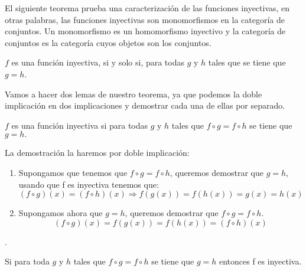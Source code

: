 %
\begin{isabellebody}%
%
%
\isadelimtheory
%
\endisadelimtheory
%
\isatagtheory
%
\endisatagtheory
{\isafoldtheory}%
%
\isadelimtheory
%
\endisadelimtheory
%
\isadelimdocument
%
\endisadelimdocument
%
\isatagdocument
%
\isamarkuptrue%
%
\endisatagdocument
{\isafolddocument}%
%
\isadelimdocument
%
\endisadelimdocument
%
\begin{isamarkuptext}%
El siguiente teorema prueba una caracterización de las funciones
 inyectivas, en otras palabras, las funciones inyectivas son
 monomorfismos en la categoría de conjuntos. Un monomorfismo es un
 homomorfismo inyectivo y la categoría de conjuntos es la categoría
 cuyos objetos son los conjuntos.
  
  \begin{teorema}
    $f$ es una función inyectiva, si y solo si, para todas $g$ y $h$
    tales que  se tiene que $g = h$. 
  \end{teorema}

Vamos a hacer dos lemas de nuestro teorema, ya que podemos la doble 
implicación en dos implicaciones y demostrar cada una de ellas por
 separado.

\begin {lema}
$f$ es una función inyectiva si para todas $g$ y $h$ tales que $f \circ
 g = f \circ h$ se tiene que $g = h.$
\end {lema}
  \begin{demostracion}
    La demostración la haremos por doble implicación: 
\begin {enumerate}
\item Supongamos que tenemos que $f \circ g = f \circ h$, queremos
 demostrar que $g = h$, usando que f es inyectiva tenemos que: \\
$$(f \circ g)(x) = (f \circ h)(x) \Longrightarrow f(g(x)) = f(h(x)) = 
g(x) = h(x)$$
\item Supongamos ahora que $g = h$, queremos demostrar que  $f \circ g
 = f \circ h$. \\
$$(f \circ g)(x) = f(g(x)) = f(h(x)) = (f \circ h)(x)$$
\end {enumerate}
.
  \end{demostracion}

\begin {lema} 
Si para toda $g$ y $h$ tales que $f \circ g =  f \circ h$ se tiene que $g
= h$ entonces f es inyectiva.
\end {lema} 


\end{isamarkuptext}
\end{isabellebody}

